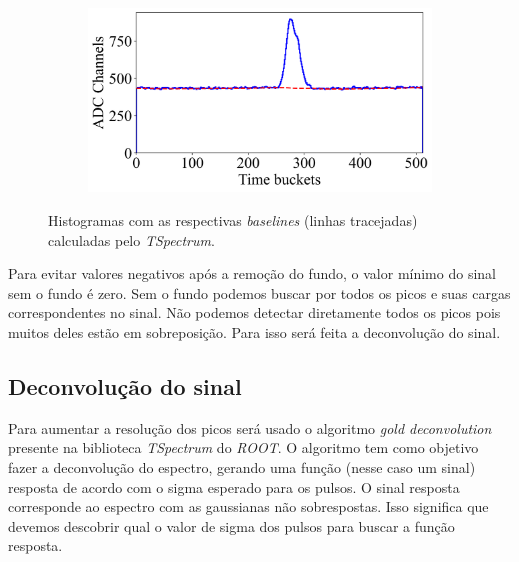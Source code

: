 \documentclass[a4paper,12pt,oneside]{book}
\begin{document}
\begin{figure}[H]
\begin{subfigure}[b]{0.48\textwidth}
        \caption{}
        \label{subfig:ex_sinal_bkg_3}
    \end{subfigure}%
    \hfill
    \begin{subfigure}[b]{0.48\textwidth}
        \centering
        \includegraphics[scale=0.395]{figs/ex_sinal_bkg_4.png}
        \caption{}
        \label{subfig:ex_sinal_bkg_4}
    \end{subfigure}
\caption{Histogramas com as respectivas \textit{baselines} (linhas tracejadas) calculadas pelo \textit{TSpectrum}.}
\label{fig:ex_sinal_bkg}
\end{figure}

\par Para evitar valores negativos após a remoção do fundo, o valor mínimo do sinal sem o fundo é zero. Sem o fundo podemos buscar por todos os picos e suas cargas correspondentes no sinal. Não podemos detectar diretamente todos os picos pois muitos deles estão em sobreposição. Para isso será feita a deconvolução do sinal.



\subsection{Deconvolução do sinal}\label{subsec:pulses_deconv}

Para aumentar a resolução dos picos será usado o algoritmo \textit{gold deconvolution} presente na biblioteca \textit{TSpectrum} do \textit{ROOT}\cite{paper_gold_deconv}. O algoritmo tem como objetivo fazer a deconvolução do espectro, gerando uma função (nesse caso um sinal) resposta de acordo com o sigma esperado para os pulsos. O sinal resposta corresponde ao espectro com as gaussianas não sobrespostas. Isso significa que devemos descobrir qual o valor de sigma dos pulsos para buscar a função resposta.
\end{document}
